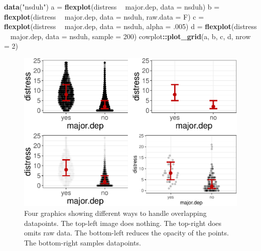 \documentclass[
  man]{apa6}
\newenvironment{Shaded}{\begin{snugshade}}{\end{snugshade}}
\newcommand{\DataTypeTok}[1]{\textcolor[rgb]{0.13,0.29,0.53}{#1}}
\newcommand{\DecValTok}[1]{\textcolor[rgb]{0.00,0.00,0.81}{#1}}
\newcommand{\FloatTok}[1]{\textcolor[rgb]{0.00,0.00,0.81}{#1}}
\newcommand{\KeywordTok}[1]{\textcolor[rgb]{0.13,0.29,0.53}{\textbf{#1}}}
\newcommand{\NormalTok}[1]{#1}
\newcommand{\OperatorTok}[1]{\textcolor[rgb]{0.81,0.36,0.00}{\textbf{#1}}}
\newcommand{\StringTok}[1]{\textcolor[rgb]{0.31,0.60,0.02}{#1}}
\begin{document}
\begin{Shaded}
\begin{Highlighting}[]
\KeywordTok{data}\NormalTok{(}\StringTok{"nsduh"}\NormalTok{)}
\NormalTok{a =}\StringTok{ }\KeywordTok{flexplot}\NormalTok{(distress }\OperatorTok{~}\StringTok{ }\NormalTok{major.dep, }\DataTypeTok{data =}\NormalTok{ nsduh)}
\NormalTok{b =}\StringTok{ }\KeywordTok{flexplot}\NormalTok{(distress }\OperatorTok{~}\StringTok{ }\NormalTok{major.dep, }\DataTypeTok{data =}\NormalTok{ nsduh, }\DataTypeTok{raw.data =}\NormalTok{ F)}
\NormalTok{c =}\StringTok{ }\KeywordTok{flexplot}\NormalTok{(distress }\OperatorTok{~}\StringTok{ }\NormalTok{major.dep, }\DataTypeTok{data =}\NormalTok{ nsduh, }\DataTypeTok{alpha =} \FloatTok{.005}\NormalTok{)}
\NormalTok{d =}\StringTok{ }\KeywordTok{flexplot}\NormalTok{(distress }\OperatorTok{~}\StringTok{ }\NormalTok{major.dep, }\DataTypeTok{data =}\NormalTok{ nsduh, }\DataTypeTok{sample =} \DecValTok{200}\NormalTok{)}
\NormalTok{cowplot}\OperatorTok{::}\KeywordTok{plot_grid}\NormalTok{(a, b, c, d, }\DataTypeTok{nrow =} \DecValTok{2}\NormalTok{)}
\end{Highlighting}
\end{Shaded}

\begin{figure}
\centering
\includegraphics{flexplot_psychmeth_files/figure-latex/sample-1.pdf}
\caption{\label{fig:sample}Four graphics showing different ways to handle overlapping datapoints. The top-left image does nothing. The top-right does omits raw data. The bottom-left reduces the opacity of the points. The bottom-right samples datapoints. \label{fig:sample}}
\end{figure}
\end{document}

